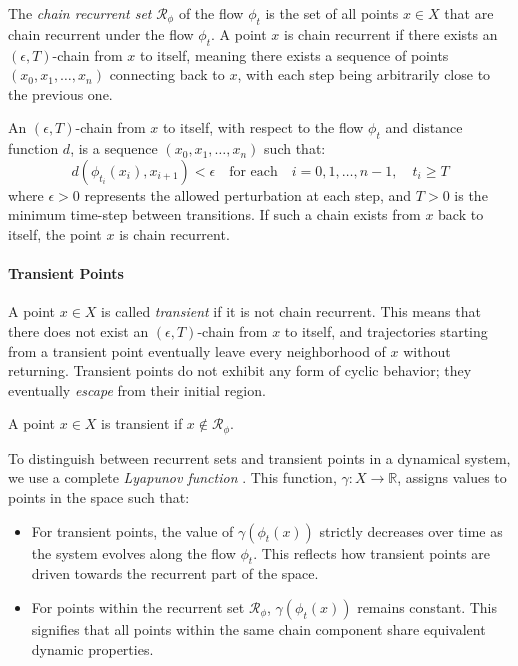             The \emph{chain recurrent set} $\mathcal{R}_\phi$ of the flow $\phi_t$ is the set of all points $x \in X$ that are chain recurrent under the flow $\phi_t$. A point $x$ is chain recurrent if there exists an $(\epsilon, T)$-chain from $x$ to itself, meaning there exists a sequence of points $(x_0, x_1, \dots, x_n)$ connecting back to $x$, with each step being arbitrarily close to the previous one.

            \begin{definition}
                An $(\epsilon, T)$-chain from $x$ to itself, with respect to the flow $\phi_t$ and distance function $d$, is a sequence $(x_0, x_1, \dots, x_n)$ such that:
                \begin{equation}
                    d(\phi_{t_i}(x_i), x_{i+1}) < \epsilon \quad \text{for each} \quad i = 0, 1, \dots, n-1, \quad t_i \geq T
                    \nonumber
                \end{equation}
                where $\epsilon > 0$ represents the allowed perturbation at each step, and $T > 0$ is the minimum time-step between transitions. If such a chain exists from $x$ back to itself, the point $x$ is chain recurrent.
            \end{definition}

        \paragraph{Transient Points}

            A point $x \in X$ is called \emph{transient} if it is not chain recurrent. This means that there does not exist an $(\epsilon, T)$-chain from $x$ to itself, and trajectories starting from a transient point eventually leave every neighborhood of $x$ without returning. Transient points do not exhibit any form of cyclic behavior; they eventually \emph{escape} from their initial region.
        
            \begin{definition}
                A point $x \in X$ is transient if $x \notin \mathcal{R}_\phi$.
            \end{definition}

        \noindent
        To distinguish between recurrent sets and transient points in a dynamical system, we use a complete \emph{Lyapunov function} \cite{lyapunov1950}. This function, $\gamma: X \to \mathbb{R}$, assigns values to points in the space such that:
        \begin{itemize}
            \item For transient points, the value of $\gamma(\phi_t(x))$ strictly decreases over time as the system evolves along the flow $\phi_t$. This reflects how transient points are driven towards the recurrent part of the space.
            \item For points within the recurrent set $\mathcal{R}_\phi$, $\gamma(\phi_t(x))$ remains constant. This signifies that all points within the same chain component share equivalent dynamic properties.
        \end{itemize}

